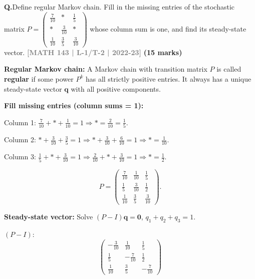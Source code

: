 \documentclass[12pt,a3paper]{article}
\newcommand{\yr}[1]{\hfill\textcolor{gray}{\small\textbf{[#1]}}}
\newcommand{\mk}[1]{\textcolor{orange!70!black}{\small\textbf{(#1 marks)}}}
\newcounter{qnum}
\newcommand{\Q}[1]{%
  \needspace{4\baselineskip}
  \refstepcounter{qnum}
  \vspace{6pt}
  \noindent\textbf{Q\theqnum.}\enspace #1\par
}
\begin{document}
 

\Q{Define regular Markov chain. Fill in the missing entries of the stochastic matrix
$P = \begin{pmatrix} \frac{7}{10} & * & \frac{1}{5} \\ * & \frac{3}{10} & * \\ \frac{1}{10} & \frac{3}{5} & \frac{3}{10} \end{pmatrix}$
whose column sum is one, and find its steady-state vector.
\yr{MATH 143 | L-1/T-2 | 2022-23} \mk{15}}

\begin{tcolorbox}[enhanced,breakable,
  colback=cA!4,colframe=cA,boxrule=0.8pt,arc=5pt,
  title={\textbf{Answer --- Regular Markov Chain; Missing Entries; Steady-State Vector}},
  fonttitle=\bfseries\color{white},colbacktitle=cA]
 
\textbf{Regular Markov chain:} A Markov chain with transition matrix $P$ is called \textbf{regular} if some power $P^k$ has all strictly positive entries.
It always has a unique steady-state vector $\mathbf{q}$ with all positive components.
 
\medskip
\textbf{Fill missing entries (column sums = 1):}
 
Column 1: $\frac{7}{10} + * + \frac{1}{10} = 1 \Rightarrow * = \frac{2}{10} = \frac{1}{5}$.
 
Column 2: $* + \frac{3}{10} + \frac{3}{5} = 1 \Rightarrow * + \frac{3}{10} + \frac{6}{10} = 1 \Rightarrow * = \frac{1}{10}$.
 
Column 3: $\frac{1}{5} + * + \frac{3}{10} = 1 \Rightarrow \frac{2}{10} + * + \frac{3}{10} = 1 \Rightarrow * = \frac{1}{2}$.
 
\[
P = \begin{pmatrix}\frac{7}{10}&\frac{1}{10}&\frac{1}{5}\\\frac{1}{5}&\frac{3}{10}&\frac{1}{2}\\\frac{1}{10}&\frac{3}{5}&\frac{3}{10}\end{pmatrix}.
\]
 
\textbf{Steady-state vector:} Solve $(P-I)\mathbf{q}=\mathbf{0}$, $q_1+q_2+q_3=1$.
 
$(P-I)$:
\[
\begin{pmatrix}-\frac{3}{10}&\frac{1}{10}&\frac{1}{5}\\\frac{1}{5}&-\frac{7}{10}&\frac{1}{2}\\\frac{1}{10}&\frac{3}{5}&-\frac{7}{10}\end{pmatrix}
\]
 

\end{tcolorbox}
\end{document}

